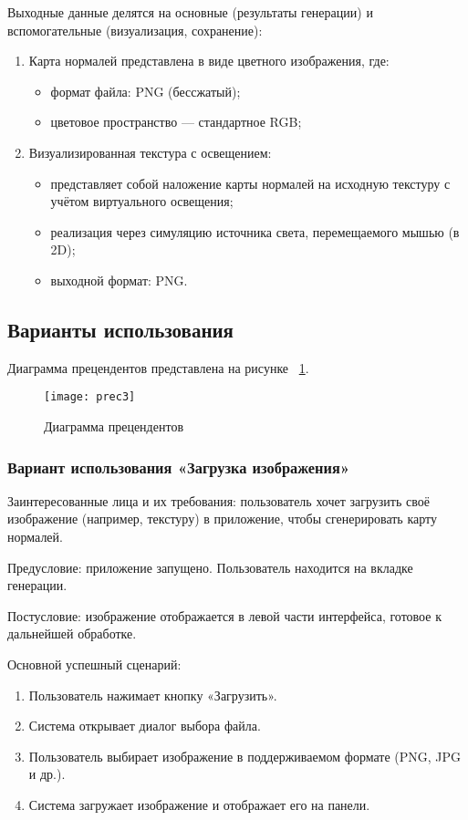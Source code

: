 Выходные данные делятся на основные (результаты генерации) и вспомогательные (визуализация, сохранение):
\begin{enumerate}
	\item Карта нормалей представлена в виде цветного изображения, где:
	\begin{itemize}
		\item формат файла: PNG (бессжатый);
		\item цветовое пространство — стандартное RGB;
	\end{itemize}	
	\item Визуализированная текстура с освещением:
	\begin{itemize}
		\item представляет собой наложение карты нормалей на исходную текстуру с учётом виртуального освещения;
		\item реализация через симуляцию источника света, перемещаемого мышью (в 2D);
		\item выходной формат: PNG.
	\end{itemize}	
\end{enumerate}
\subsection{Варианты использования}

Диаграмма прецендентов представлена на рисунке ~\ref{prec3:image}.

\begin{figure}[ht]
	\texttt{[image: prec3]}
	\caption{Диаграмма прецендентов}
	\label{prec3:image}
\end{figure}
\subsubsection{Вариант использования «Загрузка изображения»}

Заинтересованные лица и их требования: пользователь хочет загрузить своё изображение (например, текстуру) в приложение, чтобы сгенерировать карту нормалей.

Предусловие: приложение запущено. Пользователь находится на вкладке генерации.

Постусловие: изображение отображается в левой части интерфейса, готовое к дальнейшей обработке.

Основной успешный сценарий:
\begin{enumerate}
	\item Пользователь нажимает кнопку «Загрузить».
	\item Система открывает диалог выбора файла.
	\item Пользователь выбирает изображение в поддерживаемом формате (PNG, JPG и др.).
	\item Система загружает изображение и отображает его на панели.
\end{enumerate}
